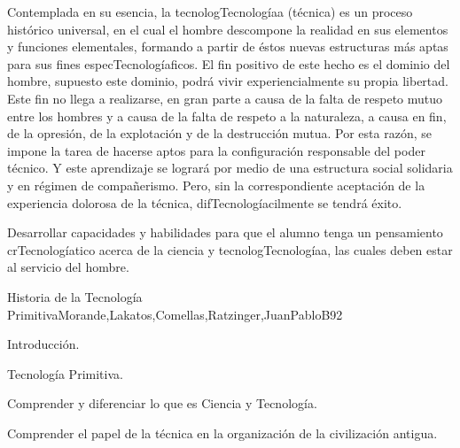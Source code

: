 \begin{syllabus}


\begin{justification}

Contemplada en su esencia, la tecnologTecnologíaa (técnica) es un proceso histórico universal, en el cual el hombre descompone la realidad en sus elementos y funciones elementales, formando a partir de éstos nuevas estructuras más aptas para sus fines especTecnologíaficos.
El fin positivo de este hecho es el dominio del hombre,  supuesto este dominio, podrá vivir experiencialmente su propia libertad. Este fin no llega a realizarse, en gran parte a causa de la falta de respeto mutuo entre los hombres y a causa de la falta de respeto a la naturaleza, a causa en fin, de la opresión, de la explotación y de la destrucción mutua.
Por esta razón, se impone la tarea de hacerse aptos para la configuración responsable del poder técnico. Y este aprendizaje se logrará por medio de una estructura social solidaria y en régimen de compañerismo. Pero, sin la correspondiente aceptación de la experiencia dolorosa de la técnica, difTecnologíacilmente se tendrá éxito.
\end{justification}

\begin{goals}
\item Desarrollar capacidades y habilidades para que el alumno tenga un pensamiento crTecnologíatico acerca de  la ciencia y tecnologTecnologíaa, las cuales deben estar al servicio del hombre.
\end{goals}

\begin{outcomes}
\end{outcomes}

\begin{unit}{Historia de la Tecnología Primitiva}{Morande,Lakatos,Comellas,Ratzinger,JuanPabloB}{9}{2}
\begin{topics}
      \item Introducción.
      \item Tecnología Primitiva.
\end{topics}

\begin{learningoutcomes}
	\item Comprender y diferenciar lo que es Ciencia y Tecnología. 
 	\item Comprender el papel de la técnica en la organización de la civilización antigua.
\end{learningoutcomes}
\end{unit}


\end{syllabus}
